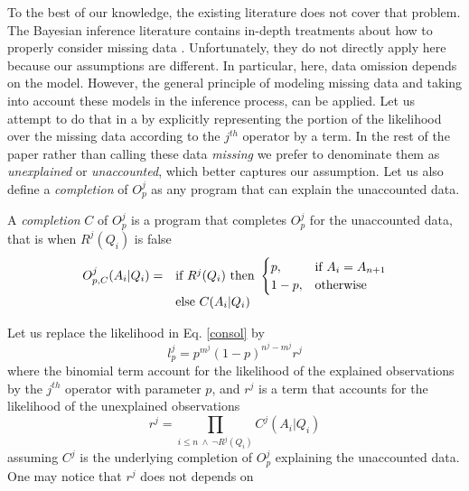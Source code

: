 \documentclass[runningheads]{llncs}
\begin{document}
To the best of our knowledge, the existing literature does not cover
that problem. The Bayesian inference literature contains in-depth
treatments about how to properly consider missing data
\cite{Schafer02missingdata}. Unfortunately, they do not directly apply
here because our assumptions are different. In particular, here, data
omission depends on the model. However, the general principle of
modeling missing data and taking into account these models in the
inference process, can be applied. Let us attempt to do that in a by
explicitly representing the portion of the likelihood over the missing
data according to the $j^{th}$ operator by a term. In the rest of the
paper rather than calling these data \emph{missing} we prefer to
denominate them as \emph{unexplained} or \emph{unaccounted}, which
better captures our assumption. Let us also define a \emph{completion}
of $O^j_p$ as any program that can explain the unaccounted data.
\begin{definition}
  A \emph{completion} $C$ of $O^j_p$ is a program that completes
  $O^j_p$ for the unaccounted data, that is when $R^j(Q_i)$ is false
  $$
  \begin{array}{@{}ll@{}}
    O^j_{p, C}(A_i|Q_i) = &
                            \text{if}\ R^j(Q_i)\ \text{then}\
                            \begin{cases}
                              p, & \text{if}\ A_i = A_{n+1} \\
                              1-p, & \text{otherwise}
                            \end{cases}\\
                          & \text{else}\ C(A_i|Q_i)
  \end{array}
  $$
\end{definition}
Let us replace the likelihood in Eq. \ref{consol} by
\begin{equation}
  \label{new-lik}
l^j_p = p^{m^j}(1-p)^{n^j-m^j} r^j
\end{equation}
where the binomial term account for the likelihood of the explained
observations by the $j^{th}$ operator with parameter $p$, and $r^j$ is
a term that accounts for the likelihood of the unexplained
observations
\begin{equation}
  r^j = \prod_{i \leq n\ \land\ \neg R^j(Q_i)} C^j(A_i|Q_i)
\end{equation}
assuming $C^j$ is the underlying completion of $O^j_p$ explaining the
unaccounted data. One may notice that $r^j$ does not depends on
\end{document}

